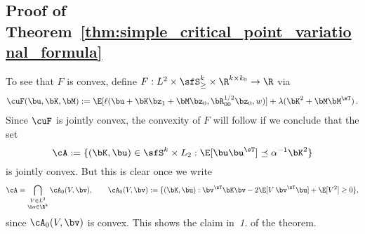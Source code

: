 \subsection{Proof of Theorem~\ref{thm:simple_critical_point_variational_formula}}
To see that $F$ is convex, define $F:   L^2\times\sfS^k_{\ge}\times \R^{k\times k_0}\to \R$  via
\begin{align}
\cuF(\bu,\bK,\bM):= \E[\ell(\bu + \bK \bz_1 + \bM \bz_0, \bR_{00}^{1/2}\bz_0, w)]  + \lambda(\bK^2 + \bM\bM^\sT)\, .
\end{align}
Since $\cuF$ is jointly convex, the convexity of $F$ will follow if we conclude that the set
\begin{equation}
    \cA := \{(\bK,\bu) \in \sfS^k \times L_2 : \E[\bu\bu^\sT]\preceq \alpha^{-1}\bK^2\}
\end{equation}
is jointly convex. But this is clear once we write
\begin{equation}
\label{eq:constraint_set_A}
    \cA = \bigcap_{\substack{V\in L^2\\\bv \in \R^k}} \cA_0(V,\bv),
    \quad\quad 
    \cA_0(V,\bv) := \{(\bK,\bu) : \bv^\sT\bK \bv  -2\E[V\, \bv^\sT\bu] + \E[V^2] \ge 0\},
\end{equation}
since $\cA_0(V,\bv)$ is convex. This shows the claim in~\textit{1.} of the theorem.

